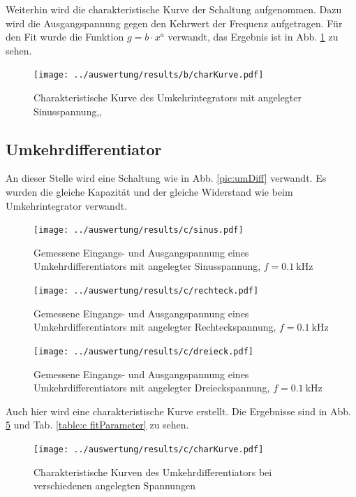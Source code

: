 Weiterhin wird die charakteristische Kurve der Schaltung aufgenommen. Dazu wird die Ausgangspannung gegen den Kehrwert der Frequenz aufgetragen. Für den Fit wurde die Funktion $g = b \cdot x^a$ verwandt, das Ergebnis ist in Abb. \ref{pic:b charKurve} zu sehen.

\begin{figure}
	\centering
	\texttt{[image: ../auswertung/results/b/charKurve.pdf]}
	\caption{Charakteristische Kurve des Umkehrintegrators mit angelegter Sinusspannung,\protect, \protect }
	\label{pic:b charKurve}
\end{figure}

\subsection{Umkehrdifferentiator}
An dieser Stelle wird eine Schaltung wie in Abb. \ref{pic:umDiff} verwandt. Es wurden die gleiche Kapazität und der gleiche Widerstand wie beim Umkehrintegrator verwandt.

\begin{figure}
	\centering
	\texttt{[image: ../auswertung/results/c/sinus.pdf]}
	\caption{Gemessene Eingangs- und Ausgangspannung eines Umkehrdifferentiators mit angelegter Sinusspannung, $f = 0.1\ \si{\kilo\hertz}$}
	\label{pic:c sinus}
\end{figure}

\begin{figure}
	\centering
	\texttt{[image: ../auswertung/results/c/rechteck.pdf]}
	\caption{Gemessene Eingangs- und Ausgangspannung eines Umkehrdifferentiators mit angelegter Rechteckspannung, $f = 0.1\ \si{\kilo\hertz}$}
	\label{pic:c rechteck}
\end{figure}

\begin{figure}
	\centering
	\texttt{[image: ../auswertung/results/c/dreieck.pdf]}
	\caption{Gemessene Eingangs- und Ausgangspannung eines Umkehrdifferentiators mit angelegter Dreieckspannung, $f = 0.1\ \si{\kilo\hertz}$}
	\label{pic:c dreieck}
\end{figure}

Auch hier wird eine charakteristische Kurve erstellt. Die Ergebnisse sind in Abb. \ref{pic:c charKurve} und Tab. \ref{table:c fitParameter} zu sehen.

\begin{figure}
	\centering
	\texttt{[image: ../auswertung/results/c/charKurve.pdf]}
	\caption{Charakteristische Kurven des Umkehrdifferentiators bei verschiedenen angelegten Spannungen}
	\label{pic:c charKurve}
\end{figure}

